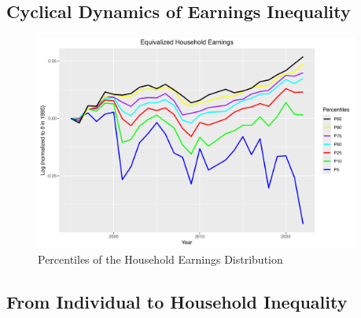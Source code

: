 \documentclass{article}
\begin{document}
\subsection{Cyclical Dynamics of Earnings Inequality}

\begin{figure}
    \centering
    \includegraphics[width=0.95\textwidth]{Fig_2/Fig_2_percentiles_a1995.png}
    \caption{Percentiles of the Household Earnings Distribution}
    \label{fig:earnings_inequality_cyclic}
\end{figure}

\subsection{From Individual to Household Inequality}
\end{document}
